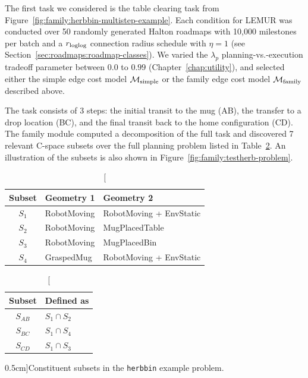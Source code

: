 The first task we considered is the table clearing task from
Figure~\ref{fig:family:herbbin-multistep-example}.
Each condition for LEMUR was conducted over 50 randomly generated
Halton roadmaps with 10,000 milestones per batch
and a $r_{\mbox{\scriptsize loglog}}$ connection radius schedule with $\eta = 1$
(see Section~\ref{sec:roadmaps:roadmap-classes}).
We varied the $\lambda_p$ planning-vs.-execution tradeoff parameter
between $0.0$ to $0.99$ (Chapter~\ref{chap:utility}),
and selected either
the simple edge cost model $\mathcal{M}_{\mbox{\scriptsize simple}}$
or the family edge cost model $\mathcal{M}_{\mbox{\scriptsize family}}$
described above.

The task consists of 3 steps:
the initial transit to the mug (AB),
the transfer to a drop location (BC),
and the final transit back to the home configuration (CD).
The family module computed a decomposition of the full task
and discovered 7 relevant C-space subsets
over the full planning problem
listed in Table~\ref{table:family:herbbin-subsets}.
An illustration of the subsets is also shown
in Figure~\ref{fig:family:testherb-problem}.

\begin{table}
   \centering
   \begin{minipage}[t]{.65\textwidth}
   \begin{tabular}{cll}
      \toprule
      Subset & Geometry 1 & Geometry 2 \\
      \midrule
      $S_1$  & RobotMoving & RobotMoving + EnvStatic \\
      $S_2$  & RobotMoving & MugPlacedTable \\
      $S_3$  & RobotMoving & MugPlacedBin \\
      $S_4$  & GraspedMug & RobotMoving + EnvStatic \\
      \bottomrule
   \end{tabular}
   \end{minipage}
   \begin{minipage}[t]{.30\textwidth}
   \begin{tabular}{cl}
      \toprule
      Subset & Defined as \\
      \midrule
      $S_{AB}$  & $S_1 \cap S_2$ \\
      $S_{BC}$  & $S_1 \cap S_4$ \\
      $S_{CD}$  & $S_1 \cap S_3$ \\
      \bottomrule
   \end{tabular}
   \end{minipage}
   \caption[][0.5cm]{Constituent subsets in the \texttt{herbbin} example
      problem.}
   \label{table:family:herbbin-subsets}
\end{table}

